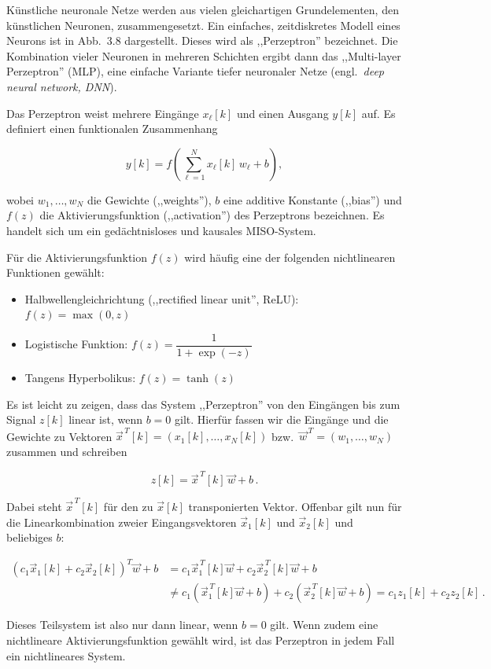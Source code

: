 \begin{beispiel}
Künstliche neuronale Netze werden aus vielen gleichartigen Grundelementen, den künstlichen Neuronen, zusammengesetzt. Ein einfaches, zeitdiskretes Modell eines Neurons ist in Abb.\ 3.8 dargestellt. Dieses wird als ,,Perzeptron'' bezeichnet. Die Kombination vieler Neuronen in mehreren Schichten ergibt dann das ,,Multi-layer Perzeptron'' (MLP), eine einfache Variante tiefer neuronaler Netze (engl.\ \textit{deep neural network, DNN}).


Das Perzeptron weist mehrere Eingänge $x_\ell[k]$ und einen Ausgang $y[k]$ auf. Es definiert einen funktionalen Zusammenhang

$$
y[k] = f\!\left(\sum_{\ell=1}^{N} x_\ell[k]\,w_\ell + b\right),
$$

wobei $w_1, \ldots, w_N$ die Gewichte (,,weights''), $b$ eine additive Konstante (,,bias'') und $f(z)$ die Aktivierungsfunktion (,,activation'') des Perzeptrons bezeichnen. Es handelt sich um ein gedächtnisloses und kausales MISO-System.

Für die Aktivierungsfunktion $f(z)$ wird häufig eine der folgenden nichtlinearen Funktionen gewählt:

\begin{itemize}
  \item Halbwellengleichrichtung (,,rectified linear unit'', ReLU): $f(z) = \max(0, z)$
  \item Logistische Funktion: $f(z) = \dfrac{1}{1 + \exp(-z)}$
  \item Tangens Hyperbolikus: $f(z) = \tanh(z)$
\end{itemize}

Es ist leicht zu zeigen, dass das System ,,Perzeptron'' von den Eingängen bis zum Signal $z[k]$ linear ist, wenn $b = 0$ gilt. Hierfür fassen wir die Eingänge und die Gewichte zu Vektoren $\vec{x}^{\,T}[k] = (x_1[k], \ldots, x_N[k])$ bzw.\ $\vec{w}^{\,T} = (w_1, \ldots, w_N)$ zusammen und schreiben

$$
z[k] = \vec{x}^{\,T}[k]\,\vec{w} + b\,.
$$

Dabei steht $\vec{x}^{\,T}[k]$ für den zu $\vec{x}[k]$ transponierten Vektor. Offenbar gilt nun für die Linearkombination zweier Eingangsvektoren $\vec{x}_1[k]$ und $\vec{x}_2[k]$ und beliebiges $b$:

\begin{align*}
(c_1\vec{x}_1[k] + c_2\vec{x}_2[k])^T\vec{w} + b &= c_1\vec{x}_1^{\,T}[k]\vec{w} + c_2\vec{x}_2^{\,T}[k]\vec{w} + b \\
&\neq c_1\!\left(\vec{x}_1^{\,T}[k]\vec{w} + b\right) + c_2\!\left(\vec{x}_2^{\,T}[k]\vec{w} + b\right) = c_1 z_1[k] + c_2 z_2[k]\,.
\end{align*}

Dieses Teilsystem ist also nur dann linear, wenn $b = 0$ gilt. Wenn zudem eine nichtlineare Aktivierungsfunktion gewählt wird, ist das Perzeptron in jedem Fall ein nichtlineares System.
\end{beispiel}

